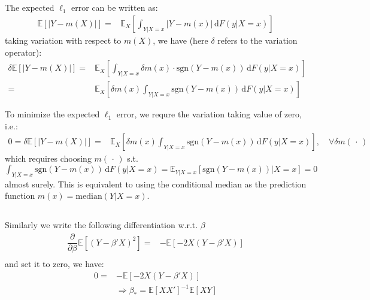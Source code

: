 \documentclass[11pt,a4paper]{ctexart}
\numberwithin{equation}{section}%
\begin{document}
\subsection{}

The expected $ \ell_1 $ error can be written as:
\begin{align*}
    \mathbb{E}\left[ \left\vert Y-m(X) \right\vert  \right] =& \mathbb{E}_X\left[  \int_{Y|X=x} \left\vert Y-m(x) \right\vert \,\mathrm{d}F(y|X=x)   \right]  
\end{align*}
taking variation with respect to $ m(X) $, we have (here $ \delta  $ refers to the variation operator):
\begin{align*}
    \delta  \mathbb{E}\left[ \left\vert Y-m(X) \right\vert  \right] =& \mathbb{E}_X\left[  \int_{Y|X=x} \delta m(x) \cdot \mathrm{ sgn }(Y-m(x))   \,\mathrm{d}F(y|X=x)   \right]  \\
    =& \mathbb{E}_X\left[ \delta m(x) \int_{Y|X=x}  \mathrm{ sgn }(Y-m(x))   \,\mathrm{d}F(y|X=x)   \right] 
\end{align*}

To minimize the expected $ \ell_1 $ error, we requre the variation taking value of zero, i.e.:
\begin{align*}
    0= \delta  \mathbb{E}\left[ \left\vert Y-m(X) \right\vert  \right] =& \mathbb{E}_X\left[ \delta m(x) \int_{Y|X=x}   \mathrm{ sgn }(Y-m(x))   \,\mathrm{d}F(y|X=x)   \right],\quad \forall \delta m(\, \cdot \, )
\end{align*}
which requires choosing $ m(\, \cdot \, ) $ s.t. $ \int_{Y|X=x}   \mathrm{ sgn }(Y-m(x))   \,\mathrm{d}F(y|X=x) = \mathbb{E}_{Y|X=x}\left[ \mathrm{ sgn } (Y-m(x)) |X=x \right] = 0 $ almost surely. This is equivalent to using the conditional median as the prediction function $ m(x) = \mathrm{ median }(Y|X=x)  $.


\subsection{}

Similarly we write the following differentiation w.r.t. $ \beta  $
\begin{align*}
    \dfrac{\partial^{}  }{\partial \beta ^{} } \mathbb{E}\left[ (Y-\beta 'X)^2 \right] =&  - \mathbb{E}\left[ -2X (Y-\beta 'X) \right] \\
\end{align*}
and set it to zero, we have:
\begin{align*}
    0=& - \mathbb{E}\left[ -2X (Y-\beta 'X) \right] \\
    &\Rightarrow \beta _* = \mathbb{E}\left[ XX' \right]^{-1} \mathbb{E}\left[ XY \right] 
\end{align*}
\end{document}
